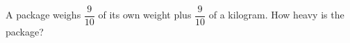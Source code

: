 A package weighs $\dfrac{9}{10}$ of its own weight plus $\dfrac{9}{10}$ of a kilogram. How heavy is the package?
